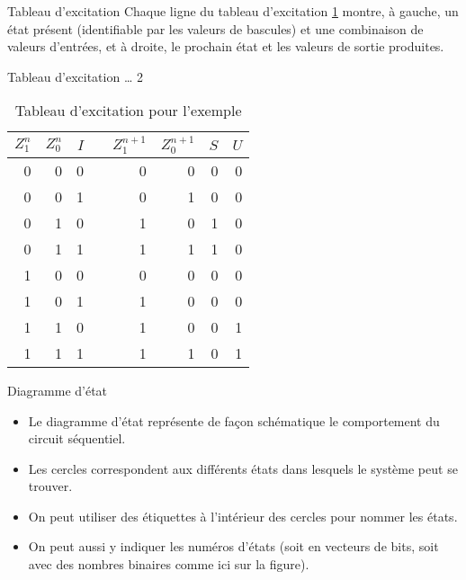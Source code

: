 \documentclass[presentation]{beamer}
\begin{document}
\begin{frame}[label={sec:org3ccd08a}]{Tableau d'excitation}
Chaque ligne du tableau d'excitation \ref{tab:orgab30ac7} montre, à gauche,
un état présent (identifiable par les valeurs de bascules) et une
combinaison de valeurs d'entrées, et à droite, le prochain état et les
valeurs de sortie produites.
\end{frame}

\begin{frame}[label={sec:org163c394}]{Tableau d'excitation \ldots{} 2}
\begin{table}[htbp]
\caption{\label{tab:orgab30ac7}Tableau d'excitation pour l'exemple}
\centering
\begin{tabular}{rrrlrrrr}
\(Z_1^n\) & \(Z_0^n\) & \(I\) &  & \(Z_1^{n+1}\) & \(Z_0^{n+1}\) & \(S\) & \(U\)\\
\hline
0 & 0 & 0 &  & 0 & 0 & 0 & 0\\
0 & 0 & 1 &  & 0 & 1 & 0 & 0\\
0 & 1 & 0 &  & 1 & 0 & 1 & 0\\
0 & 1 & 1 &  & 1 & 1 & 1 & 0\\
1 & 0 & 0 &  & 0 & 0 & 0 & 0\\
1 & 0 & 1 &  & 1 & 0 & 0 & 0\\
1 & 1 & 0 &  & 1 & 0 & 0 & 1\\
1 & 1 & 1 &  & 1 & 1 & 0 & 1\\
\end{tabular}
\end{table}
\end{frame}

\begin{frame}[label={sec:org9e10d8d}]{Diagramme d'état}
\begin{itemize}
\item Le diagramme d'état représente de façon schématique le comportement du circuit séquentiel.

\item Les cercles correspondent aux différents états dans lesquels le système peut se trouver.

\item On peut utiliser des étiquettes à l'intérieur des cercles pour nommer les états.

\item On peut aussi y indiquer les numéros d'états (soit en vecteurs de bits, soit avec des nombres binaires comme ici sur la figure).
\end{itemize}
\end{frame}
\end{document}
